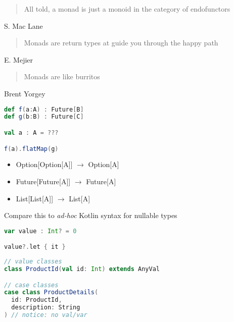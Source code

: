 \documentclass[10pt]{beamer}
\begin{document}
\begin{frame}[fragile]
\begin{quotation}
All told, a monad is just a monoid in the category of endofunctors 
\end{quotation}
\begin{flushright}
S. Mac Lane
\end{flushright}
\begin{quotation}
Monads are return types at guide you through the happy path 
\end{quotation}
\begin{flushright}
E. Mejier 
\end{flushright}
\begin{quotation}
Monads are like burritos 
\end{quotation}
\begin{flushright}
Brent Yorgey
\end{flushright}
\end{frame}

\begin{frame}[fragile]
\begin{lstlisting}[language=Scala, basicstyle=\ttfamily]
def f(a:A) : Future[B]
def g(b:B) : Future[C]

val a : A = ???

f(a).flatMap(g)
\end{lstlisting}
\end{frame}


\begin{frame}
\begin{itemize}
\item Option[Option[A]] $\rightarrow$ Option[A]
\item Future[Future[A]] $\rightarrow$ Future[A]
\item List[List[A]] $\rightarrow$ List[A]
\end{itemize}
\end{frame}
\begin{frame}[fragile]
Compare this to \emph{ad-hoc} Kotlin syntax for nullable types 
\begin{lstlisting}[language=Scala, basicstyle=\ttfamily]
var value : Int? = 0

value?.let { it }
\end{lstlisting}
\end{frame}

\begin{frame}[fragile]
\begin{lstlisting}[language=Scala, basicstyle=\ttfamily]
// value classes 
class ProductId(val id: Int) extends AnyVal 

// case classes 
case class ProductDetails(
  id: ProductId,
  description: String
) // notice: no val/var 
\end{lstlisting}
\end{frame}
\end{document}
